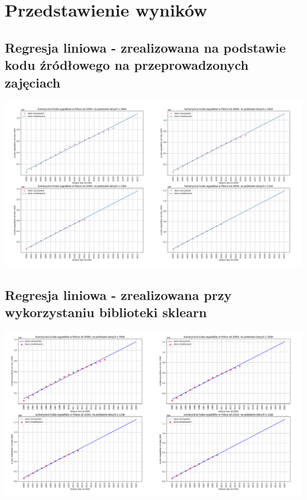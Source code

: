 \documentclass{article}
\begin{document}
\section{Przedstawienie wyników}
\subsection{Regresja liniowa - zrealizowana na podstawie kodu źródłowego na przeprowadzonych zajęciach}
 \begin{center}
        \includegraphics[scale=0.18]{liniowareczny.jpg}
    \end{center}
\subsection{Regresja liniowa - zrealizowana przy wykorzystaniu biblioteki sklearn}
 \begin{center}
        \includegraphics[scale=0.18]{liniowabiblioteka.jpg}
    \end{center}
\end{document}

